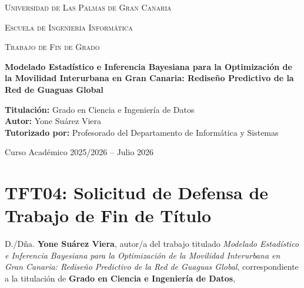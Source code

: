 \documentclass[11pt,a4paper,twoside]{report}
\begin{document}
\begin{titlepage}
    \centering
    {\scshape\LARGE Universidad de Las Palmas de Gran Canaria \par}
    \vspace{0.8cm}
    {\scshape\Large Escuela de Ingeniería Informática \par}
    \vspace{1.5cm}
    {\scshape\large Trabajo de Fin de Grado \par}
    \vspace{0.5cm}
    {\huge\bfseries Modelado Estadístico e Inferencia Bayesiana para la Optimización de la Movilidad Interurbana en Gran Canaria: Rediseño Predictivo de la Red de Guaguas Global \par}
    \vspace{2cm}
    \textbf{Titulación:} Grado en Ciencia e Ingeniería de Datos \\[0.4cm]
    \textbf{Autor:} Yone Suárez Viera \\[0.4cm]
    \textbf{Tutorizado por:} Profesorado del Departamento de Informática y Sistemas \\[1.5cm]
    {\large Curso Académico 2025/2026 -- Julio 2026 \par}
\end{titlepage}

\chapter*{TFT04: Solicitud de Defensa de Trabajo de Fin de Título}
\thispagestyle{empty}

D./Dña. \textbf{Yone Suárez Viera}, autor/a del trabajo titulado \textit{Modelado Estadístico e Inferencia Bayesiana para la Optimización de la Movilidad Interurbana en Gran Canaria: Rediseño Predictivo de la Red de Guaguas Global}, correspondiente a la titulación de \textbf{Grado en Ciencia e Ingeniería de Datos},
\end{document}
